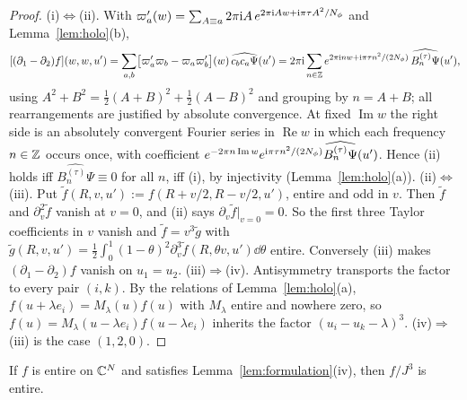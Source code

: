 \begin{proof}
(i)$\Leftrightarrow$(ii). With $\varpi_a'(w)=\sum_{A\equiv a}2\pi\mathrm{i} A\,e^{2\pi\mathrm{i} Aw+\mathrm{i}\pi\tau A^2/N_{\phi}}$ and Lemma~\ref{lem:holo}(b),
\[
[(\partial_1-\partial_2)f](w,w,u')=\sum_{a,b}\bigl[\varpi_a'\varpi_b-\varpi_a\varpi_b'\bigr](w)\,\widehat{c_bc_a\Psi}(u')
=2\pi\mathrm{i}\sum_{n\in\mathbb{Z}}e^{2\pi\mathrm{i} nw+\mathrm{i}\pi\tau n^2/(2N_{\phi})}\,\widehat{B^{(\tau)}_n\Psi}(u'),
\]
using $A^2+B^2=\frac12(A+B)^2+\frac12(A-B)^2$ and grouping by $n=A+B$; all rearrangements are justified by absolute
convergence. At fixed $\operatorname{Im}w$ the right side is an absolutely convergent Fourier series in $\operatorname{Re}w$ in which each
frequency $n\in\mathbb{Z}$ occurs once, with coefficient
$e^{-2\pi n\operatorname{Im}w}e^{\mathrm{i}\pi\tau n^2/(2N_{\phi})}\widehat{B^{(\tau)}_{n}\Psi}(u')$. Hence (ii) holds iff
$\widehat{B^{(\tau)}_n\Psi}\equiv0$ for all $n$, iff (i), by injectivity (Lemma~\ref{lem:holo}(a)).
(ii)$\Leftrightarrow$(iii). Put $\tilde f(R,v,u'):=f(R+v/2,R-v/2,u')$, entire and odd in $v$. Then $\tilde f$ and
$\partial_v^2\tilde f$ vanish at $v=0$, and (ii) says $\partial_v\tilde f|_{v=0}=0$. So the first three Taylor coefficients in $v$
vanish and $\tilde f=v^3\tilde g$ with $\tilde g(R,v,u')=\frac12\int_0^1(1-\theta)^2\partial_v^3\tilde f(R,\theta v,u')\dd\theta$ entire.
Conversely (iii) makes $(\partial_1-\partial_2)f$ vanish on $u_1=u_2$.
(iii)$\Rightarrow$(iv). Antisymmetry transports the factor to every pair $(i,k)$. By the relations of
Lemma~\ref{lem:holo}(a), $f(u+\lambda e_i)=M_\lambda(u)f(u)$ with $M_\lambda$ entire and nowhere zero, so
$f(u)=M_\lambda(u-\lambda e_i)f(u-\lambda e_i)$ inherits the factor $(u_i-u_k-\lambda)^3$. (iv)$\Rightarrow$(iii) is the case
$(1,2,0)$.
\end{proof}

\begin{lemma}[division by $J^3$]\label{lem:division}
If $f$ is entire on $\mathbb{C}^N$ and satisfies Lemma~\ref{lem:formulation}(iv), then $f/J^3$ is entire.
\end{lemma}

